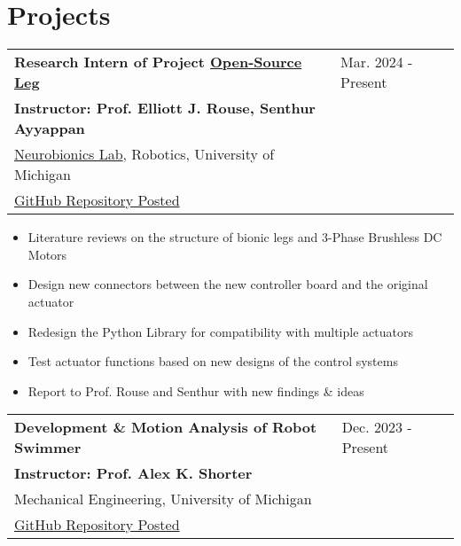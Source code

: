 \documentclass[letter,12pt]{article}
\begin{document}
\section{Projects}

\begin{tabularx}{\linewidth}{@{}l X@{}}
\large \textbf{Research Intern of Project \href{https://www.opensourceleg.org/about}{Open-Source Leg}} & \hfill Mar. 2024 - Present \\
\small{\textbf{Instructor: Prof. Elliott J. Rouse, Senthur Ayyappan}} & \hfill {} \\
\small{\href{https://neurobionics.robotics.umich.edu/}{Neurobionics Lab}, Robotics, University of Michigan} & \hfill {} \\
\small{\href{https://github.com/neurobionics/opensourceleg}{GitHub Repository Posted}} & \hfill {} \\
\end{tabularx}

\begin{itemize}[
    rightmargin=2cm
]
    \setlength{\itemsep}{1pt}
    \setlength{\parskip}{0pt}
    \setlength{\parsep}{0pt}
    \item{\small Literature reviews on the structure of bionic legs and 3-Phase Brushless DC Motors}
    \item{\small Design new connectors between the new controller board and the original actuator}
    \item{\small Redesign the Python Library for compatibility with multiple actuators}
    \item{\small Test actuator functions based on new designs of the control systems}
    \item{\small Report to Prof. Rouse and Senthur with new findings \& ideas}
\end{itemize}

\begin{tabularx}{\linewidth}{@{}l X@{}}
\large \textbf{Development \& Motion Analysis of Robot Swimmer} & \hfill Dec. 2023 - Present \\
\small{\textbf{Instructor: Prof. Alex K. Shorter}} & \hfill {} \\
\small{Mechanical Engineering, University of Michigan} & \hfill {} \\
\small{\href{https://github.com/Robin0265/PathPlanning_Code}{GitHub Repository Posted}} & \hfill {} \\
\end{tabularx}
\end{document}
